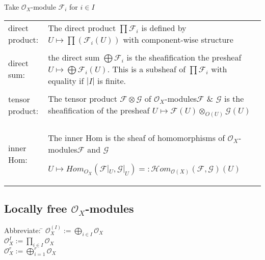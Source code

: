 \documentclass[a4paper, 12pt]{article}
\newcommand{\ca}[1]{\mathcal{#1}}
\newcommand{\caf}{\mathcal{F}}
\newcommand{\cag}{\mathcal{G}}
\newcommand{\oxmod}{$\mathcal{O}_X$-module }
\newcommand{\oxmods}{$\mathcal{O}_X$-modules}
\newcommand{\ox}{\mathcal{O}_X}
\begin{document}
Take \oxmod  $\ca{F}_i$ for $i \in I$
\\
\begin{longtable}{p{}  p{} } 


direct product: & The direct product $\prod \ca{F}_i$ is defined by $U\longmapsto \prod(\ca{F}_i(U))$ with component-wise structure
\\

&\\

direct sum: & the direct sum $\bigoplus \ca{F}_i$ is the sheafification the presheaf $U\longmapsto \bigoplus \ca{F}_i(U)$. This is a subsheaf of $\prod\ca{F}_i$ with equality if $|I|$ is finite.
\\

&\\

tensor product: &The tensor product $\ca{F}\otimes\ca{G}$ of \oxmods $\ca{F}$ \& $\cag$ is the sheafification of the presheaf $U\longmapsto \caf(U)\otimes_{O(U)}\cag(U)$
\\

&\\

inner Hom: & The inner Hom is the sheaf of homomorphisms of \oxmods $\caf$ and $\cag$

$U\longmapsto Hom_{O_X}(\caf|_U , \cag|_U) =: \ca{H}om_{\ca{O}(X)}(\caf , \cag)(U)$
\\

\end{longtable}


\subsection{Locally free \oxmods}

\begin{tabbing}
  Abbreviate:     \= $\ox^{(I)} := \bigoplus_{i \in I} \ox $\\
  \>$  \ox^I := \prod_{i \in I} \ox $\\
  \> $ \ox^r := \bigoplus^{r}_{i=1}\ox$
\end{tabbing}
\\
\end{document}
